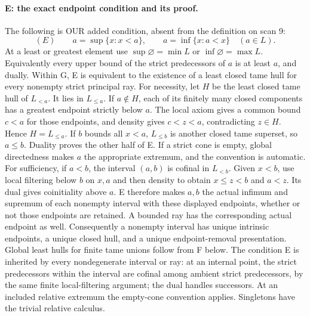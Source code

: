 \paragraph{E: the exact endpoint condition and its proof.}\label{lem:E}
The following is OUR added condition, absent from the definition on scan 9:
\[
(E)\qquad a=\sup\{x:x<a\},\qquad a=\inf\{x:a<x\}\quad(a\in L).
\]
At a least or greatest element use $\sup\varnothing=\min L$ or $\inf\varnothing=\max L$. Equivalently every upper bound of the strict predecessors of $a$ is at least $a$, and dually. Within G, E is equivalent to the existence of a least closed tame hull for every nonempty strict principal ray.
For necessity, let $H$ be the least closed tame hull of $L_{<a}$. It lies in $L_{\leq a}$. If $a\notin H$, each of its finitely many closed components has a greatest endpoint strictly below $a$. The local axiom gives a common bound $c<a$ for those endpoints, and density gives $c<z<a$, contradicting $z\in H$. Hence $H=L_{\leq a}$. If $b$ bounds all $x<a$, $L_{\leq b}$ is another closed tame superset, so $a\leq b$. Duality proves the other half of E. If a strict cone is empty, global directedness makes $a$ the appropriate extremum, and the convention is automatic.
For sufficiency, if $a<b$, the interval $(a,b)$ is cofinal in $L_{<b}$. Given $x<b$, use local filtering below $b$ on $x,a$ and then density to obtain $x\leq z<b$ and $a<z$. Its dual gives coinitiality above $a$. E therefore makes $a,b$ the actual infimum and supremum of each nonempty interval with these displayed endpoints, whether or not those endpoints are retained. A bounded ray has the corresponding actual endpoint as well. Consequently a nonempty interval has unique intrinsic endpoints, a unique closed hull, and a unique endpoint-removal presentation. Global least hulls for finite tame unions follow from F below. The condition E is inherited by every nondegenerate interval or ray: at an internal point, the strict predecessors within the interval are cofinal among ambient strict predecessors, by the same finite local-filtering argument; the dual handles successors. At an included relative extremum the empty-cone convention applies. Singletons have the trivial relative calculus.
